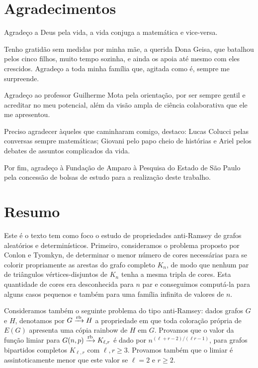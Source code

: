\documentclass[12pt,a4paper]{book}
\newcommand{\K}{K_{\ell,r}} %
\def\rbarrow{\xrightarrow[]{\raisebox{0.0mm}[0mm]{$\scriptstyle \rm rb$}}}
\begin{document}

 \chapter*{Agradecimentos}

Agradeço a Deus pela vida, a vida conjuga a matemática e vice-versa.

Tenho gratidão sem medidas por minha mãe, a querida Dona Geisa, que batalhou pelos cinco filhos, muito tempo sozinha, e ainda os apoia até mesmo com eles crescidos. 
Agradeço a toda minha família que, agitada como é, sempre me surpreende.

Agradeço ao professor Guilherme Mota pela orientação, por ser sempre gentil e acreditar no meu potencial, além da visão ampla de ciência colaborativa que ele me apresentou.

Preciso agradecer àqueles que caminharam comigo, destaco: Lucas Colucci pelas conversas sempre matemáticas; Giovani pelo papo cheio de histórias e Ariel pelos debates de assuntos complicados da vida.

Por fim, agradeço à Fundação de Amparo à Pesquisa do Estado de São Paulo pela concessão de bolsas de estudo para a realização deste trabalho.

\chapter*{Resumo}

 Este é o texto tem como foco o estudo de propriedades anti-Ramsey de grafos aleatórios e determinísticos.
 Primeiro,
consideramos o problema proposto por Conlon e Tyomkyn, de determinar o menor número de cores necessárias para se colorir propriamente as arestas do grafo completo $K_n$,
de modo que nenhum par de triângulos vértices-disjuntos de $K_n$ tenha a mesma tripla de cores. 
Esta quantidade de cores era desconhecida para $n$ par e conseguimos computá-la para alguns casos pequenos e também para uma família infinita de valores de $n$.

Consideramos também o seguinte problema do tipo anti-Ramsey: dados grafos $G$ e $H$, denotamos por $G \rbarrow H$ a propriedade em que toda coloração própria de $E(G)$ apresenta uma cópia rainbow de $H$ em $G$.
Provamos que o valor da função limiar para $G(n,p) \rbarrow K_{\ell,r}$ é dado por $n^{(\ell+r-2)/(\ell r-1)}$, para grafos bipartidos completos $\K$ com $\ell,r \geq 3$. Provamos também que o limiar é assintoticamente menor que este valor se $\ell=2$ e $r\geq 2$.
\\
\end{document}
